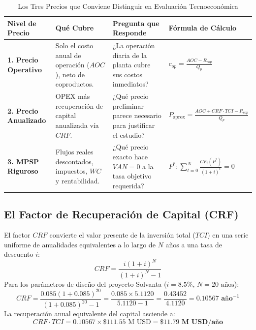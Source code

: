 \documentclass[11pt,letterpaper]{article}
\begin{document}
\begin{table}[htbp]
    \centering
    \small
    \caption{Los Tres Precios que Conviene Distinguir en Evaluación Tecnoeconómica}
    \footnotesize
    \setlength{\tabcolsep}{4pt}
    \begin{tabularx}{\textwidth}{>{\raggedright\arraybackslash}p{2.8cm} X X >{\raggedright\arraybackslash}p{4.8cm}}
        \toprule
        \rowcolor{tableheader}
        \textbf{\color{white}Nivel de Precio} & \textbf{\color{white}Qué Cubre} & \textbf{\color{white}Pregunta que Responde} & \textbf{\color{white}Fórmula de Cálculo} \\
        \midrule
        \textbf{1. Precio Operativo} & Solo el costo anual de operación ($AOC$), neto de coproductos. & ¿La operación diaria de la planta cubre sus costos inmediatos? & $\displaystyle c_{op} = \frac{AOC - R_{cop}}{Q_p}$ \\
        \rowcolor{tablerowgray}
        \textbf{2. Precio Anualizado} & OPEX más recuperación de capital anualizada vía $CRF$. & ¿Qué precio preliminar parece necesario para justificar el estudio? & $\displaystyle P_{\text{aprox}} = \frac{AOC + CRF \cdot TCI - R_{cop}}{Q_p}$ \\
        \textbf{3. MPSP Riguroso} & Flujos reales descontados, impuestos, $WC$ y rentabilidad. & ¿Qué precio exacto hace $VAN = 0$ a la tasa objetivo requerida? & $\displaystyle P^* \colon \sum_{t=0}^N \frac{CF_t(P^*)}{(1+i)^t} = 0$ \\
        \bottomrule
    \end{tabularx}
\end{table}

\subsection{El Factor de Recuperación de Capital (CRF)}
El factor $CRF$ convierte el valor presente de la inversión total ($TCI$) en una serie uniforme de anualidades equivalentes a lo largo de $N$ años a una tasa de descuento $i$:
\begin{equation}
    CRF = \frac{i(1 + i)^N}{(1 + i)^N - 1}
\end{equation}
Para los parámetros de diseño del proyecto Solvanta ($i = 8.5\%$, $N = 20\text{ años}$):
\begin{equation}
    CRF = \frac{0.085(1 + 0.085)^{20}}{(1 + 0.085)^{20} - 1} = \frac{0.085 \times 5.1120}{5.1120 - 1} = \frac{0.43452}{4.1120} = \mathbf{0.10567\text{ año}^{-1}}
\end{equation}
La recuperación anual equivalente del capital asciende a:
\begin{equation}
    CRF \cdot TCI = 0.10567 \times \$111.55\text{ M USD} = \mathbf{\$11.79\text{ M USD/año}}
\end{equation}
\end{document}
